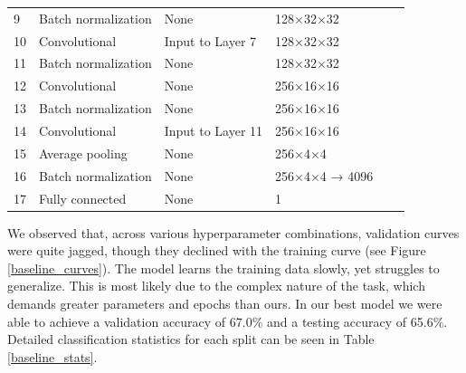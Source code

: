 \documentclass{article} %
\begin{document}
\begin{table}[t]
\begin{center}
\begin{tabular}{llllll}
            9                                 & Batch normalization                & None                                         & 128×32×32                                         \\
            10                                & Convolutional                      & Input to Layer 7                             & 128×32×32                                         \\
            11                                & Batch normalization                & None                                         & 128×32×32                                         \\
            12                                & Convolutional                      & None                                         & 256×16×16                                         \\
            13                                & Batch normalization                & None                                         & 256×16×16                                         \\
            14                                & Convolutional                      & Input to Layer 11                            & 256×16×16                                         \\
            15                                & Average pooling                    & None                                         & 256×4×4                                           \\
            16                                & Batch normalization                & None                                         & 256×4×4 → 4096                                    \\
            17                                & Fully connected                    & None                                         & 1                                                 \\
        \end{tabular}
    \end{center}
\end{table}

We observed that, across various hyperparameter combinations, validation curves were quite jagged, though they declined with the training curve (see Figure \ref{baseline_curves}). The model learns the training data slowly, yet struggles to generalize. This is most likely due to the complex nature of the task, which demands greater parameters and epochs than ours. In our best model we were able to achieve a validation accuracy of 67.0\% and a testing accuracy of 65.6\%. Detailed classification statistics for each split can be seen in Table \ref{baseline_stats}.
\end{document}

